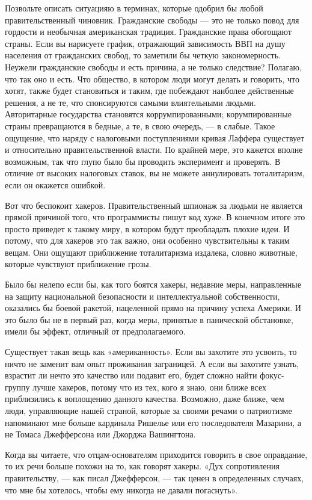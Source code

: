 \documentclass[ebook,12pt,oneside,openany]{memoir}
\begin{document}
Позвольте описать ситуацияю в терминах, которые одобрил бы любой
правительственный чиновник. Гражданские свободы — это не только повод
для гордости и необычная американская традиция. Гражданские права
обогощают страны. Если вы нарисуете график, отражающий зависимость ВВП
на душу населения от гражданских свобод, то заметили бы четкую
закономерность. Неужели гражданские свободы и есть причина, а не
только следствие? Полагаю, что так оно и есть. Что общество, в котором
люди могут делать и говорить, что хотят, также будет становиться и
таким, где побеждают наиболее действенные решения, а не те, что
спонсируются самыми влиятельными людьми. Авторитарные государства
становятся коррумпированными; корумпированные страны превращаются в
бедные, а те, в свою очередь, — в слабые. Такое ощущение, что наряду с
налоговыми поступлениями кривая Лаффера существует и относительно
правительственной власти. По крайней мере, это кажется вполне
возможным, так что глупо было бы проводить эксперимент и проверять. В
отличие от высоких налоговых ставок, вы не можете аннулировать
тоталитаризм, если он окажется ошибкой.

Вот что беспокоит хакеров. Правительственный шпионаж за людьми не
является прямой причиной того, что программисты пишут код хуже. В
конечном итоге это просто приведет к такому миру, в котором будут
преобладать плохие идеи. И потому, что для хакеров это так важно, они
особенно чувствительны к таким вещам. Они ощущают приближение
тоталитаризма издалека, словно животные, которые чувствуют приближение
грозы.

Было бы нелепо если бы, как того боятся хакеры, недавние меры,
направленные на защиту национальной безопасности и интеллектуальной
собственности, оказались бы боевой ракетой, нацеленной прямо на
причину успеха Америки. И это было бы не в первый раз, когда меры,
принятые в панической обстановке, имели бы эффект, отличный от
предполагаемого.

Существует такая вещь как «американность». Если вы захотите это
усвоить, то ничто не заменит вам опыт проживания заграницей. А если вы
захотите узнать, взрастит ли нечто это качество или подавит его, будет
сложно найти фокус-группу лучше хакеров, потому что из тех, кого я
знаю, они ближе всех приблизились к воплощению данного качества.
Возможно, даже ближе, чем люди, управляющие нашей страной, которые за
своими речами о патриотизме напоминают мне больше кардинала Ришелье
или его последователя Мазарини, а не Томаса Джефферсона или Джорджа
Вашингтона.

Когда вы читаете, что отцам-основателям приходится говорить в свое
оправдание, то их речи больше похожи на то, как говорят хакеры. «Дух
сопротивления правительству, — как писал Джефферсон, — так ценен в
определенных случаях, что мне бы хотелось, чтобы ему никогда не давали
погаснуть».
\end{document}
